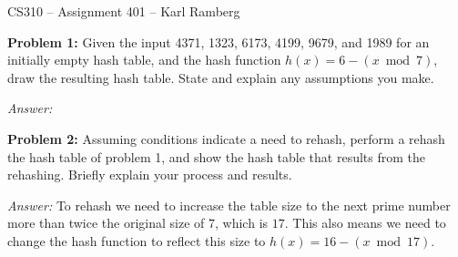 \documentclass[11pt]{article}
\begin{document}
\thispagestyle{empty}

\begin{center}
CS310 -- Assignment 401 -- Karl Ramberg
\end{center}

\textbf{Problem 1:} Given the input 4371, 1323, 6173, 4199, 9679, and
1989 for an initially empty hash table, and the hash function $h(x) =
6 - (x \bmod 7)$, draw the resulting hash table. State and explain any
assumptions you make.

\textit{Answer:}

\begin{center}
\end{center}

\textbf{Problem 2:} Assuming conditions indicate a need to rehash, perform a
rehash the hash table of problem 1, and show the hash table that results from
the rehashing. Briefly explain your process and results.

\textit{Answer:} To rehash we need to increase the table size to the next
prime number more than twice the original size of $7$, which is $17$.
This also means we need to change the hash function to reflect this size to
$h(x) = 16 - (x \bmod 17)$. 
\end{document}
